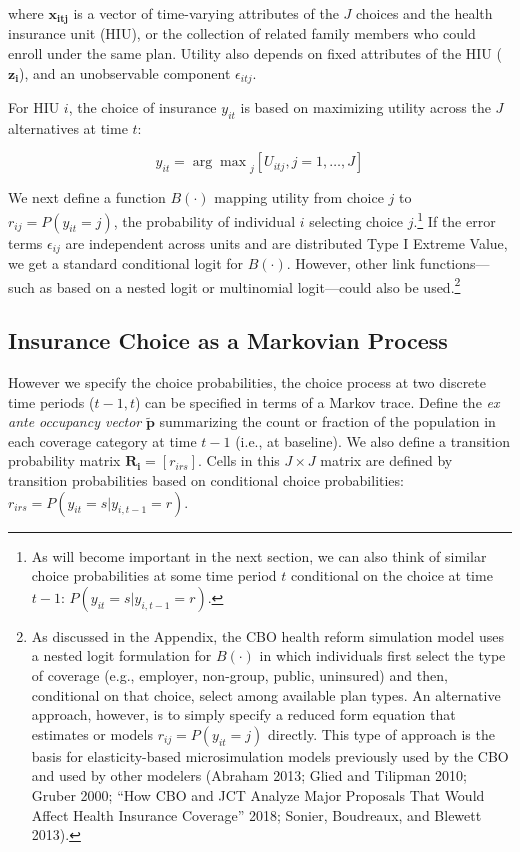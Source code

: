 \documentclass[
  10pt,
]{article}
\begin{document}
\noindent where \(\mathbf{x_{itj}}\) is a vector of time-varying
attributes of the \(J\) choices and the health insurance unit (HIU), or
the collection of related family members who could enroll under the same
plan. Utility also depends on fixed attributes of the HIU
(\(\mathbf{z_i}\)), and an unobservable component \(\epsilon_{itj}\).

For HIU \(i\), the choice of insurance \(y_{it}\) is based on maximizing
utility across the \(J\) alternatives at time \(t\):

\[
y_{it} = {\arg \max}_j [U_{itj}, j = 1, \dots, J]
\]

We next define a function \(B(\cdot)\) mapping utility from choice \(j\)
to \(r_{ij} = P(y_{it} = j)\), the probability of individual \(i\)
selecting choice \(j\).\footnote{As will become important in the next
  section, we can also think of similar choice probabilities at some
  time period \(t\) conditional on the choice at time \(t-1\):
  \(P(y_{it} = s | y_{i,t-1}=r)\).} If the error terms \(\epsilon_{ij}\)
are independent across units and are distributed Type I Extreme Value,
we get a standard conditional logit for \(B(\cdot)\). However, other
link functions---such as based on a nested logit or multinomial
logit---could also be used.\footnote{As discussed in the Appendix, the
  CBO health reform simulation model uses a nested logit formulation for
  \(B(\cdot)\) in which individuals first select the type of coverage
  (e.g., employer, non-group, public, uninsured) and then, conditional
  on that choice, select among available plan types. An alternative
  approach, however, is to simply specify a reduced form equation that
  estimates or models \(r_{ij} = P(y_{it} = j)\) directly. This type of
  approach is the basis for elasticity-based microsimulation models
  previously used by the CBO and used by other modelers (Abraham 2013;
  Glied and Tilipman 2010; Gruber 2000; ``How CBO and JCT Analyze Major
  Proposals That Would Affect Health Insurance Coverage'' 2018; Sonier,
  Boudreaux, and Blewett 2013).}

\hypertarget{insurance-choice-as-a-markovian-process}{%
\subsection{Insurance Choice as a Markovian
Process}\label{insurance-choice-as-a-markovian-process}}

However we specify the choice probabilities, the choice process at two
discrete time periods (\(t-1, t\)) can be specified in terms of a Markov
trace. Define the \emph{ex ante occupancy vector}
\(\boldsymbol{\tilde p}\) summarizing the count or fraction of the
population in each coverage category at time \(t-1\) (i.e., at
baseline). We also define a transition probability matrix
\(\boldsymbol{R_i} = [r_{irs}]\). Cells in this \(J \times J\) matrix
are defined by transition probabilities based on conditional choice
probabilities: \(r_{irs} = P(y_{it} = s | y_{i,t-1}=r)\).
\end{document}
